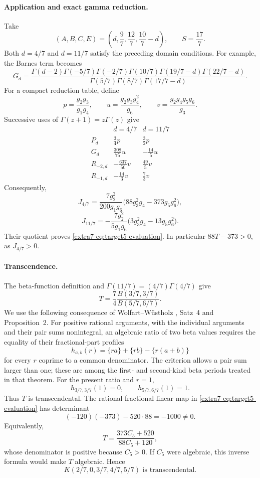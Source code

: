 \documentclass[11pt,a4paper]{article}
\theoremstyle{definition}
\theoremstyle{remark}
\numberwithin{equation}{section}
\begin{document}
\paragraph{Application and exact gamma reduction.}
Take
\[
 (A,B,C,E)=\left(d,\frac97,\frac{12}7,\frac{10}7-d\right),
 \qquad S=\frac{17}7.
\]
Both $d=4/7$ and $d=11/7$ satisfy the preceding domain conditions.
For example, the Barnes term becomes
\[
 G_d=\frac{\Gamma(d-2)\Gamma(-5/7)\Gamma(-2/7)
 \Gamma(10/7)\Gamma(19/7-d)\Gamma(22/7-d)}
 {\Gamma(5/7)\Gamma(8/7)\Gamma(17/7-d)}.
\]
For a compact reduction table, define
\[
 p=\frac{g_2g_3}{g_1g_4},\qquad
 u=\frac{g_2g_3g_4^2}{g_6},\qquad
 v=\frac{g_2g_4g_5g_6}{g_3}.
\]
Successive uses of $\Gamma(z+1)=z\Gamma(z)$ give
\[
\begin{array}{c|cc}
 &d=4/7&d=11/7\\ \hline
 P_d&\frac34p&\frac32p\\[2pt]
 G_d&\frac{308}{75}u&-\frac{14}{5}u\\[2pt]
 R_{-2,d}&-\frac{637}{50}v&\frac{49}{5}v\\[2pt]
 R_{-1,d}&-\frac{14}{3}v&\frac73v
\end{array}
\]
Consequently,
\[
 J_{4/7}=\frac{7g_2^2}{200g_1g_6}
 \bigl(88g_3^2g_4-373g_5g_6^2\bigr),
\]
\[
 J_{11/7}=-\frac{7g_2^2}{5g_1g_6}
 \bigl(3g_3^2g_4-13g_5g_6^2\bigr).
\]
Their quotient proves \eqref{extra7-eq:target5-evaluation}.
In particular $88T-373>0$, as $J_{4/7}>0$.

\paragraph{Transcendence.}
The beta-function definition and $\Gamma(11/7)=(4/7)\Gamma(4/7)$
give
\[
 T=\frac74\frac{B(3/7,3/7)}{B(5/7,6/7)}.
\]
We use the following consequence of Wolfart--W\"ustholz
\cite{dbkz-ww}, Satz~4 and Proposition~2. For positive rational arguments,
with the individual arguments and their pair sums nonintegral,
an algebraic ratio of two beta values requires the equality of their
fractional-part profiles
\[
 h_{a,b}(r)=\{ra\}+\{rb\}-\{r(a+b)\}
\]
for every $r$ coprime to a common denominator.
The criterion allows a pair sum larger than one; these are among
the first- and second-kind beta periods treated in that theorem.
For the present ratio and $r=1$,
\[
 h_{3/7,3/7}(1)=0,\qquad h_{5/7,6/7}(1)=1.
\]
Thus $T$ is transcendental. The rational fractional-linear map in
\eqref{extra7-eq:target5-evaluation} has determinant
\[
 (-120)(-373)-520\cdot88=-1000\ne0.
\]
Equivalently,
\[
 T=\frac{373C_5+520}{88C_5+120},
\]
whose denominator is positive because $C_5>0$.
If $C_5$ were algebraic, this inverse formula would make $T$
algebraic. Hence
\[
 \boxed{K(2/7,0,3/7,4/7,5/7)\text{ is transcendental}.}
\]
\end{document}
